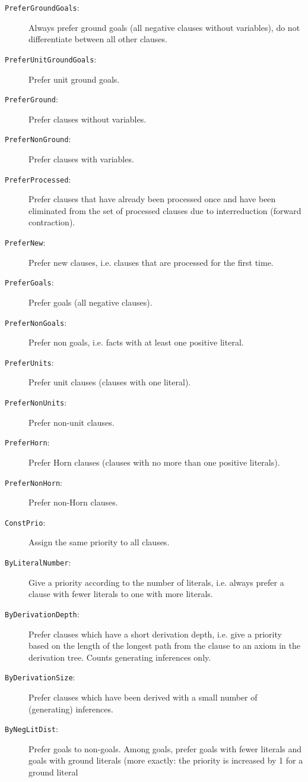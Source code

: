 \documentclass{article}
\begin{document}
\begin{description}
\item[\texttt{PreferGroundGoals}:] Always prefer ground goals (all
  negative clauses without variables), do not differentiate between
  all other clauses.
\item[\texttt{PreferUnitGroundGoals}:] Prefer unit ground goals.
\item[\texttt{PreferGround}:] Prefer clauses without variables.
\item[\texttt{PreferNonGround}:] Prefer clauses with variables.
\item[\texttt{PreferProcessed}:] Prefer clauses that have already been
  processed once and have been eliminated from the set of processed
  clauses due to interreduction (forward contraction).
\item[\texttt{PreferNew}:] Prefer new clauses, i.e. clauses that are
  processed for the first time.
\item[\texttt{PreferGoals}:] Prefer goals (all negative clauses).
\item[\texttt{PreferNonGoals}:] Prefer non goals, i.e. facts with at
  least one positive literal.
\item[\texttt{PreferUnits}:] Prefer unit clauses (clauses with one
  literal).
\item[\texttt{PreferNonUnits}:] Prefer non-unit clauses.
\item[\texttt{PreferHorn}:] Prefer Horn clauses (clauses with no more
  than one positive literals).
\item[\texttt{PreferNonHorn}:] Prefer non-Horn clauses. 
\item[\texttt{ConstPrio}:] Assign the same priority to all clauses.
\item[\texttt{ByLiteralNumber}:] Give a priority according to the
  number of literals, i.e. always prefer a clause with fewer literals
  to one with more literals.
\item[\texttt{ByDerivationDepth}:] Prefer clauses which have a short
  derivation depth, i.e. give a priority based on the length of the
  longest path from the clause to an axiom in the derivation
  tree. Counts generating inferences only.
\item[\texttt{ByDerivationSize}:] Prefer clauses which have been
  derived with a small number of (generating) inferences.
\item[\texttt{ByNegLitDist}:] Prefer goals to non-goals. Among goals,
  prefer goals with fewer literals and goals with ground literals
  (more exactly: the priority is increased by 1 for a ground literal

\end{description}
\end{document}
